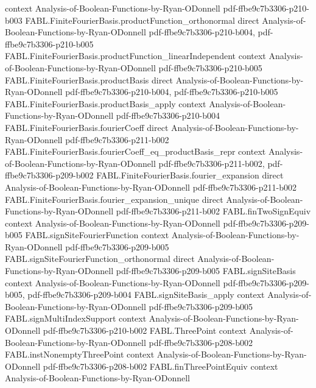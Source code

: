 \begin{theorem}
  {context}
  {Analysis-of-Boolean-Functions-by-Ryan-ODonnell}
  {pdf-ffbe9c7b3306-p210-b003}
\proofstep
  {FABL.FiniteFourierBasis.productFunction_orthonormal}
  {direct}
  {Analysis-of-Boolean-Functions-by-Ryan-ODonnell}
  {pdf-ffbe9c7b3306-p210-b004,
    pdf-ffbe9c7b3306-p210-b005}
\proofstep
  {FABL.FiniteFourierBasis.productFunction_linearIndependent}
  {context}
  {Analysis-of-Boolean-Functions-by-Ryan-ODonnell}
  {pdf-ffbe9c7b3306-p210-b005}
\proofstep
  {FABL.FiniteFourierBasis.productBasis}
  {direct}
  {Analysis-of-Boolean-Functions-by-Ryan-ODonnell}
  {pdf-ffbe9c7b3306-p210-b004,
    pdf-ffbe9c7b3306-p210-b005}
\proofstep
  {FABL.FiniteFourierBasis.productBasis_apply}
  {context}
  {Analysis-of-Boolean-Functions-by-Ryan-ODonnell}
  {pdf-ffbe9c7b3306-p210-b004}
\proofstep
  {FABL.FiniteFourierBasis.fourierCoeff}
  {direct}
  {Analysis-of-Boolean-Functions-by-Ryan-ODonnell}
  {pdf-ffbe9c7b3306-p211-b002}
\proofstep
  {FABL.FiniteFourierBasis.fourierCoeff_eq_productBasis_repr}
  {context}
  {Analysis-of-Boolean-Functions-by-Ryan-ODonnell}
  {pdf-ffbe9c7b3306-p211-b002,
    pdf-ffbe9c7b3306-p209-b002}
\proofstep
  {FABL.FiniteFourierBasis.fourier_expansion}
  {direct}
  {Analysis-of-Boolean-Functions-by-Ryan-ODonnell}
  {pdf-ffbe9c7b3306-p211-b002}
\proofstep
  {FABL.FiniteFourierBasis.fourier_expansion_unique}
  {direct}
  {Analysis-of-Boolean-Functions-by-Ryan-ODonnell}
  {pdf-ffbe9c7b3306-p211-b002}
\proofstep
  {FABL.finTwoSignEquiv}
  {context}
  {Analysis-of-Boolean-Functions-by-Ryan-ODonnell}
  {pdf-ffbe9c7b3306-p209-b005}
\proofstep
  {FABL.signSiteFourierFunction}
  {context}
  {Analysis-of-Boolean-Functions-by-Ryan-ODonnell}
  {pdf-ffbe9c7b3306-p209-b005}
\proofstep
  {FABL.signSiteFourierFunction_orthonormal}
  {direct}
  {Analysis-of-Boolean-Functions-by-Ryan-ODonnell}
  {pdf-ffbe9c7b3306-p209-b005}
\proofstep
  {FABL.signSiteBasis}
  {context}
  {Analysis-of-Boolean-Functions-by-Ryan-ODonnell}
  {pdf-ffbe9c7b3306-p209-b005,
    pdf-ffbe9c7b3306-p209-b004}
\proofstep
  {FABL.signSiteBasis_apply}
  {context}
  {Analysis-of-Boolean-Functions-by-Ryan-ODonnell}
  {pdf-ffbe9c7b3306-p209-b005}
\proofstep
  {FABL.signMultiIndexSupport}
  {context}
  {Analysis-of-Boolean-Functions-by-Ryan-ODonnell}
  {pdf-ffbe9c7b3306-p210-b002}
\proofstep
  {FABL.ThreePoint}
  {context}
  {Analysis-of-Boolean-Functions-by-Ryan-ODonnell}
  {pdf-ffbe9c7b3306-p208-b002}
\proofstep
  {FABL.instNonemptyThreePoint}
  {context}
  {Analysis-of-Boolean-Functions-by-Ryan-ODonnell}
  {pdf-ffbe9c7b3306-p208-b002}
\proofstep
  {FABL.finThreePointEquiv}
  {context}
  {Analysis-of-Boolean-Functions-by-Ryan-ODonnell}

\end{theorem}

